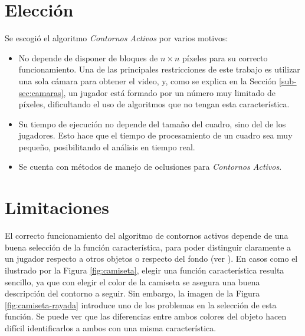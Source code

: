 \section{Elección}
\label{sec:eleccion}

Se escogió el algoritmo \emph{Contornos Activos} por varios motivos:
\begin{itemize}
    \item No depende de disponer de bloques de $n \times n$ píxeles para su
        correcto funcionamiento. Una de las principales restricciones de este
        trabajo es utilizar una sola cámara para obtener el video, y, como se
        explica en la Sección \ref{sub-sec:camaras}, un jugador está formado
        por un número muy limitado de píxeles, dificultando el uso de
        algoritmos que no tengan esta característica.

    \item Su tiempo de ejecución no depende del tamaño del cuadro, sino del
        de los jugadores. Esto hace que el tiempo de procesamiento de un cuadro
        sea muy pequeño, posibilitando el análisis en tiempo real.

    \item Se cuenta con métodos de manejo de oclusiones para
        \emph{Contornos Activos}\cite{paper-juliana}.

\end{itemize}

\section{Limitaciones}
\label{sec:ac-problemas}

El correcto funcionamiento del algoritmo de contornos activos depende de una
buena selección de la función característica, para poder distinguir claramente
a un jugador respecto a otros objetos o respecto del fondo (ver
\cite{fast-level-set}). En casos como el ilustrado por la Figura
\ref{fig:camiseta}, elegir una función característica resulta sencillo, ya que
con elegir el color de la camiseta se asegura una buena descripción del
contorno a seguir. Sin embargo, la imagen de la Figura
\ref{fig:camiseta-rayada} introduce uno de los problemas en la selección de
esta función. Se puede ver que las diferencias entre ambos colores del objeto
hacen difícil identificarlos a ambos con una misma característica.


